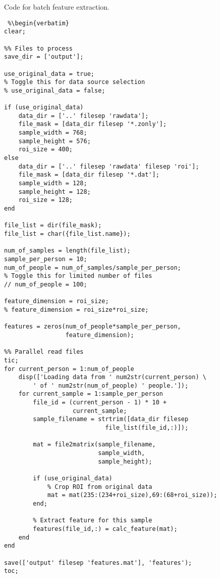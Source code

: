 Code for batch feature extraction.

\begin{lstlisting} %\begin{verbatim}
clear;

%% Files to process
save_dir = ['output'];

use_original_data = true;
% Toggle this for data source selection
% use_original_data = false;

if (use_original_data)
    data_dir = ['..' filesep 'rawdata'];
    file_mask = [data_dir filesep '*.zonly'];
    sample_width = 768;
    sample_height = 576;
    roi_size = 400;
else
    data_dir = ['..' filesep 'rawdata' filesep 'roi'];
    file_mask = [data_dir filesep '*.dat'];
    sample_width = 128;
    sample_height = 128;
    roi_size = 128;
end

file_list = dir(file_mask);
file_list = char({file_list.name});

num_of_samples = length(file_list);
sample_per_person = 10;
num_of_people = num_of_samples/sample_per_person;
% Toggle this for limited number of files
// num_of_people = 100;

feature_dimension = roi_size;
% feature_dimension = roi_size*roi_size;

features = zeros(num_of_people*sample_per_person,
                 feature_dimension);

%% Parallel read files
tic;
for current_person = 1:num_of_people
    disp(['Loading data from ' num2str(current_person) \
        ' of ' num2str(num_of_people) ' people.']);
    for current_sample = 1:sample_per_person
        file_id = (current_person - 1) * 10 +
                   current_sample;
        sample_filename = strtrim([data_dir filesep
                            file_list(file_id,:)]);

        mat = file2matrix(sample_filename,
                          sample_width,
                          sample_height);

        if (use_original_data)
            % Crop ROI from original data
            mat = mat(235:(234+roi_size),69:(68+roi_size));
        end;

        % Extract feature for this sample
        features(file_id,:) = calc_feature(mat);
    end
end

save(['output' filesep 'features.mat'], 'features');
toc;
\end{lstlisting} %
\clearpage

